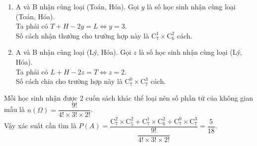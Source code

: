 \begin{vd}
{\begin{enumerate}[TH $1$.]
\begin{itemize}
				\item Vì $x=4$ nên ta có $5$ cuốn sách Hóa và $5$ tổng $3$ sách Toán còn lại và $2$ sách Lý còn lại. Số cách nhận thưởng phụ thuộc vào số lượng sách ít nhất là $2$ sách Lý còn lại, có $\mathrm{C}^2_{5}$ cách.
			\end{itemize}
			Suy ra số cách nhận thưởng cho trường hợp này là $\mathrm{C}^2_{7} \times \mathrm{C}^2_{5}$ cách.
			\item A và B nhận cùng loại (Toán, Hóa). Gọi $y$ là số học sinh nhận cùng loại (Toán, Hóa).\\
			Ta phải có $T+H-2y=L \Leftrightarrow y=3$.\\
			Số cách nhận thưởng cho trường hợp này là $\mathrm{C}^1_{7} \times \mathrm{C}^2_{6}$ cách.
			\item A và B nhận cùng loại (Lý, Hóa). Gọi $z$ là số học sinh nhận cùng loại (Lý, Hóa).\\
			Ta phải có $L+H-2z=T \Leftrightarrow z=2$.\\
			Số cách chia cho trường hợp này là $\mathrm{C}^0_{7} \times \mathrm{C}^3_{7} $ cách.
		\end{enumerate} 
		Mỗi học sinh nhận được $2$ cuốn sách khác thể loại nên số phần tử của không gian mẫu là $n(\Omega)=\dfrac{9!}{4! \times 3! \times 2!}$.\\
		Vậy xác suất cần tìm là $P(A)=\dfrac{\mathrm{C}^2_{7} \times \mathrm{C}^2_{5}+\mathrm{C}^1_{7} \times \mathrm{C}^2_{6}+\mathrm{C}^0_{7} \times \mathrm{C}^3_{7}}{\dfrac{9!}{4! \times 3! \times 2!}}=\dfrac{5}{18}$.
	}
\end{vd}

